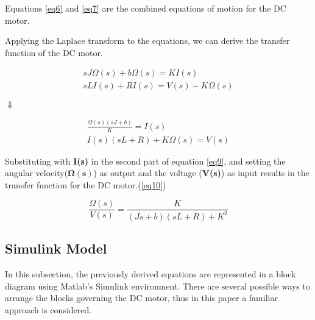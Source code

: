 Equations \ref{eq6} and \ref{eq7} are the combined equations of motion for the DC motor.

Applying the Laplace transform to the equations, we can derive the transfer function of the DC motor.

\begin{align}  
sJ\Omega(s) + b\Omega(s) = KI(s) \label{eq8}\\
sLI(s) + RI(s) = V(s) - K\Omega(s) \nonumber
\end{align}

\begin{center}
$\Downarrow$
\end{center}

\begin{align} 
\frac{\Omega(s)(sJ + b)}{K} = I(s) \label{eq9} \\
I(s)(sL + R) + K\Omega(s) = V(s)  \nonumber 
\end{align}

Substituting with \textbf{I(s)} in the second part of equation \ref{eq9}, and setting the angular velocity($\boldsymbol{\Omega(s)}$) as output and the voltage (\textbf{V(s)}) as input results in the transfer function for the DC motor.(\ref{eq10})

\begin{equation} \label{eq10}
\frac{\Omega(s)}{V(s)} = \frac{K}{(Js + b)(sL + R) + K^2}
\end{equation}

\subsection{Simulink Model} \label{dc_model}

In this subsection, the previously derived equations are represented in a block diagram using Matlab's Simulink environment. There are several possible ways to arrange the blocks governing the DC motor, thus in this paper a familiar approach is considered.

